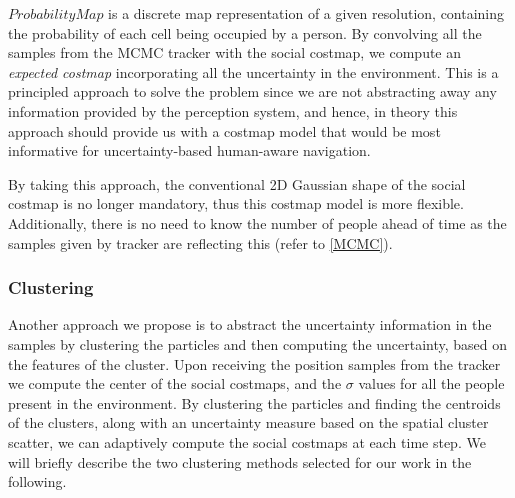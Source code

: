 $ProbabilityMap$ is a discrete map representation of a given resolution, containing the probability of each cell being occupied by a person. By convolving all the samples from the MCMC tracker with the social costmap, we compute an \textit{expected costmap} incorporating all the uncertainty in the environment. This is a principled approach to solve the problem 
since we are not abstracting away any information provided by the perception system, and hence, in theory this approach should provide us with a costmap model that would be most informative for uncertainty-based human-aware navigation.



   
By taking this approach, the conventional 2D Gaussian shape of the social costmap is no longer mandatory, thus this costmap model is more flexible. Additionally, there is no need to know the number of people ahead of time as the samples given by tracker are reflecting this (refer to \ref{MCMC}).%



\subsubsection*{\normalfont \textbf{Clustering}}
Another approach we propose is to abstract the uncertainty information in the samples by clustering the particles and then computing the uncertainty, based on the features of the cluster. Upon receiving the position samples from the tracker we compute the center of the social costmaps, and the ${\sigma}$ values for all the people present in the environment. By clustering the particles and finding the centroids of the clusters, along with an uncertainty measure based on the spatial cluster scatter, we can adaptively compute the social costmaps at each time step. We will briefly describe the two clustering methods selected for our work in the following.
